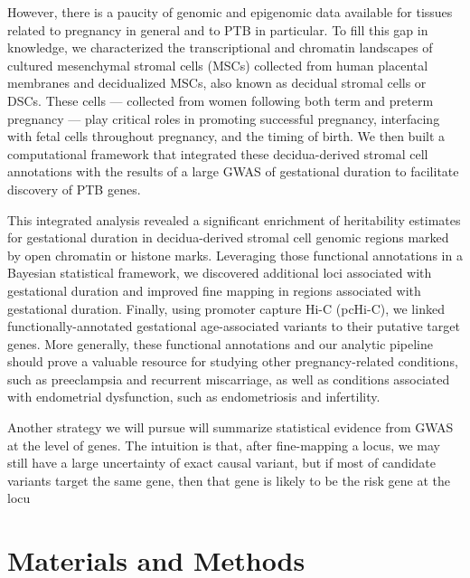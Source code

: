 However, there is a paucity of genomic and epigenomic data available for tissues related to pregnancy in general and to PTB in particular. To fill this gap in knowledge, we characterized the transcriptional and chromatin landscapes of cultured mesenchymal stromal cells (MSCs) collected from human placental membranes and decidualized MSCs, also known as decidual stromal cells or DSCs. These cells --- collected from women following both term and preterm pregnancy --- play critical roles in promoting successful pregnancy, interfacing with fetal cells throughout pregnancy, and the timing of birth. We then built a computational framework that integrated these decidua-derived stromal cell annotations with the results of a large GWAS of gestational duration to facilitate discovery of PTB genes. 


This integrated analysis revealed a significant enrichment of heritability estimates for gestational duration in decidua-derived stromal cell genomic regions marked by open chromatin or histone marks. Leveraging those functional annotations in a Bayesian statistical framework, we discovered additional loci associated with gestational duration and improved fine mapping in regions associated with gestational duration. Finally, using promoter capture Hi-C (pcHi-C), we linked functionally-annotated gestational age-associated variants to their putative target genes. More generally, these functional annotations and our analytic pipeline should prove a valuable resource for studying other pregnancy-related conditions, such as preeclampsia and recurrent miscarriage, as well as conditions associated with endometrial dysfunction, such as endometriosis and infertility.

Another strategy we will pursue will summarize statistical evidence from GWAS at the level of genes. The intuition is that, after fine-mapping a locus, we may still have a large uncertainty of exact causal variant, but if most of candidate variants target the same gene, then that gene is likely to be the risk gene at the locu

\section{Materials and Methods}\label{sec:org39326e2}

